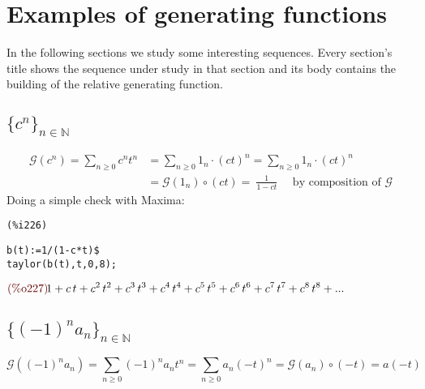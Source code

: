 
\section{Examples of generating functions}

In the following sections we study some interesting sequences. Every
section's title shows the sequence under study in that section and its
body contains the building of the relative generating function.

\subsection{$\{c^n\}_{n\in \mathbb{N} }$}
\begin{displaymath}
  \begin{split}
    \mathcal{G} (c^n) = \sum_{n \geq 0}{c^n t^n} &= \sum_{n \geq
      0}{1_n\cdot (ct)^n} = \sum_{n \geq 0}{1_n \cdot (ct)^n}  \\
    &= \mathcal{G} (1_n) \circ (ct) = \ \frac{1}{1-ct} \quad \text{ by
    composition of } \mathcal{G} 
  \end{split}
\end{displaymath}
Doing a simple check with Maxima:

\noindent
\begin{minipage}[t]{8ex}{\color{red}\bf
\begin{verbatim}
(%i226) 
\end{verbatim}}
\end{minipage}
\begin{minipage}[t]{\textwidth}{\color{blue}
\begin{verbatim}
b(t):=1/(1-c*t)$
taylor(b(t),t,0,8);
\end{verbatim}}
\end{minipage}
\begin{math}\displaystyle
\parbox{8ex}{\color{labelcolor}(\%o227) }
1+c\,t+{c}^{2}\,{t}^{2}+{c}^{3}\,{t}^{3}+{c}^{4}\,{t}^{4}+{c}^{5}\,{t}^{5}+{c}^{6}\,{t}^{6}+{c}^{7}\,{t}^{7}+{c}^{8}\,{t}^{8}+...
\end{math}

\subsection{$\{(-1)^n a_n\}_{n\in \mathbb{N} }$}
\begin{displaymath}
    \mathcal{G} ((-1)^n a_n) = \sum_{n \geq 0}{(-1)^n a_n t^n} = \sum_{n \geq
      0}{a_n (-t)^n} = \mathcal{G} (a_n) \circ (-t) = a(-t)
\end{displaymath}

